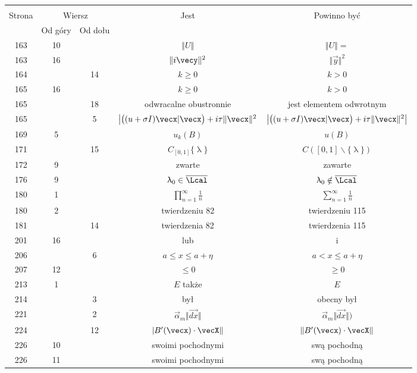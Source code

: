 \documentclass[a4paper,11pt]{article}
\numberwithin{equation}{section}
\renewcommand{\lambda}{\uplambda}
\begin{document}
\begin{center}
  \begin{tabular}{|c|c|c|c|c|}
    \hline
    & \multicolumn{2}{c|}{} & & \\
    Strona & \multicolumn{2}{c|}{Wiersz} & Jest
                              & Powinno być \\ \cline{2-3}
    & Od góry & Od dołu & & \\
    \hline
    163 & 10 & & $\Vert U \Vert$ & $\Vert U \Vert =$ \\
    163 & 16 & & $\Vert i\vecy \Vert^{ 2 }$ & $\Vert \vec{ y } \Vert^{ 2 }$ \\
    164 & & 14 & $k \geq 0$ & $k > 0$ \\
    165 & 16 & & $k \geq 0$ & $k > 0$ \\
    165 & & 18 & odwracalne obustronnie & jest elementem odwrotnym \\
    165 & &  5 & $\big{ | } \big( ( u + \sigma I ) \vecx |
                 \vecx \big) + i \tau \Vert \vecx \Vert^{ 2 }$
           & $\big{ | } \big( ( u + \sigma I ) \vecx | \vecx \big)
             + i \tau \Vert \vecx \Vert^{ 2 } \big{ | }$ \\
    169 &  5 & & $u_{ k }( B )$ & $u( B )$ \\
    171 & & 15 & $C_{ [ 0, 1 ] } \{ \lambda \}$
           & $C( [ 0, 1 ] \backslash \{ \lambda \} )$ \\
    172 &  9 & & zwarte & zawarte \\
    176 &  9 & & $\lambda_{ 0 } \in \overline{ \Lcal }$
           & $\lambda_{ 0 } \notin \overline{ \Lcal }$ \\
    180 &  1 & & $\prod^{ \infty }_{ n = 1 } \frac{ 1 }{ n }$
           & $\sum^{ \infty }_{ n = 1 } \frac{ 1 }{ n }$ \\
    180 &  2 & & twierdzeniu 82 & twierdzeniu 115 \\
    181 & & 14 & twierdzenia 82 & twierdzenia 115 \\
    201 & 16 & & lub & i \\
    206 & &  6 & $a \leq x \leq a + \eta$ & $a < x \leq a + \eta$ \\
    207 & 12 & & $\leq 0$ & $\geq 0$ \\
    213 &  1 & & $E$ także & $E$ \\
    214 & &  3 & był & obecny był \\
    221 & &  2 & $\vec{ \alpha }_{ m } \Vert \overrightarrow{ dx } \Vert$
           & $\vec{ \alpha }_{ m } \Vert \overrightarrow{ dx } \Vert )$ \\
    224 & & 12 & $| B'( \vecx ) \cdot \vecX \Vert$
           & $\Vert B'( \vecx ) \cdot \vecX \Vert$ \\
    226 & 10 & & swoimi pochodnymi & swą pochodną \\
    226 & 11 & & swoimi pochodnymi & swą pochodną \\
    \hline
  \end{tabular}






\end{center}
\end{document}

